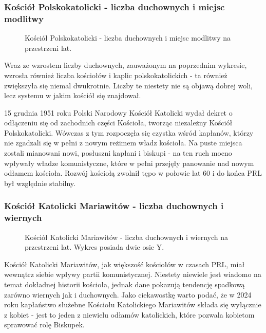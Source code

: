 \documentclass[12pt]{article}
\begin{document}
\subsubsection{Kościół Polskokatolicki - liczba duchownych i miejsc modlitwy}
\begin{figure}[H]
    
    \caption{Kościół Polskokatolicki - liczba duchownych i miejsc modlitwy na przestrzeni lat.}
\end{figure}
Wraz ze wzrostem liczby duchownych, zauważonym na poprzednim wykresie, wzrosła również liczba kościołów i kaplic polskokatolickich - ta również zwiększyła się niemal dwukrotnie.
Liczby te niestety nie są objawą dobrej woli, lecz systemu w jakim kościół się znajdował. 

15 grudnia 1951 roku Polski Narodowy Kościół Katolicki wydał dekret o odłączeniu się od 
zachodnich części Kościoła, tworząc niezależny Kościół Polskokatolicki. Wówczas z tym rozpoczęła się czystka wśród kapłanów, którzy nie zgadzali się w pełni z nowym reżimem władz kościoła. 
Na puste miejsca zostali mianowani nowi, posłuszni kapłani i biskupi - na ten ruch mocno wpływały władze komunistyczne, które w pełni przejęły panowanie nad nowym odłamem kościoła. 
Rozwój kościołą zwolnił tępo w połowie lat 60 i do końca PRL był względnie stabilny. 


\subsubsection{Kościół Katolicki Mariawitów - liczba duchownych i wiernych}
\begin{figure}[H]
    
    \caption{Kościół Katolicki Mariawitów - liczba duchownych i wiernych na przestrzeni lat. Wykres posiada dwie osie Y.}
\end{figure}
Kościół Katolicki Mariawitów, jak większość kościołów w czasach PRL, miał wewnątrz siebie wpływy partii komunistycznej. Niestety niewiele jest wiadomo na temat dokładnej historii kościoła, 
jednak dane pokazują tendencję spadkową zarówno wiernych jak i duchownych. Jako ciekawostkę warto podać, że w 2024 roku kapłaństwo służebne Kościołu Katolickiego Mariawitów składa się wyłącznie z kobiet - jest to jeden z niewielu odłamów katolickich, które pozwala 
kobietom sprawować rolę Biskupek.
\end{document}
